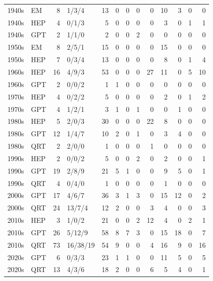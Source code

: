 \begin{longtable}{@{}llrlrrrrrrrrr@{}}
1940s & EM & 8 & 1/3/4 & 13 & 0 & 0 & 0 & 0 & 10 & 3 & 0 & 0 \\
1940s & HEP & 4 & 0/1/3 & 5 & 0 & 0 & 0 & 0 & 3 & 0 & 1 & 1 \\
1940s & GPT & 2 & 1/1/0 & 2 & 0 & 0 & 2 & 0 & 0 & 0 & 0 & 0 \\
1950s & EM & 8 & 2/5/1 & 15 & 0 & 0 & 0 & 0 & 15 & 0 & 0 & 0 \\
1950s & HEP & 7 & 0/3/4 & 13 & 0 & 0 & 0 & 0 & 8 & 0 & 1 & 4 \\
1960s & HEP & 16 & 4/9/3 & 53 & 0 & 0 & 0 & 27 & 11 & 0 & 5 & 10 \\
1960s & GPT & 2 & 0/0/2 & 1 & 1 & 0 & 0 & 0 & 0 & 0 & 0 & 0 \\
1970s & HEP & 4 & 0/2/2 & 5 & 0 & 0 & 0 & 0 & 2 & 0 & 1 & 2 \\
1970s & GPT & 4 & 1/2/1 & 3 & 1 & 0 & 1 & 0 & 0 & 1 & 0 & 0 \\
1980s & HEP & 5 & 2/0/3 & 30 & 0 & 0 & 0 & 22 & 8 & 0 & 0 & 0 \\
1980s & GPT & 12 & 1/4/7 & 10 & 2 & 0 & 1 & 0 & 3 & 4 & 0 & 0 \\
1980s & QRT & 2 & 2/0/0 & 1 & 0 & 0 & 0 & 1 & 0 & 0 & 0 & 0 \\
1990s & HEP & 2 & 0/0/2 & 5 & 0 & 0 & 2 & 0 & 2 & 0 & 0 & 1 \\
1990s & GPT & 19 & 2/8/9 & 21 & 5 & 1 & 0 & 0 & 9 & 5 & 0 & 1 \\
1990s & QRT & 4 & 0/4/0 & 1 & 0 & 0 & 0 & 0 & 1 & 0 & 0 & 0 \\
2000s & GPT & 17 & 4/6/7 & 36 & 3 & 1 & 3 & 0 & 15 & 12 & 0 & 2 \\
2000s & QRT & 24 & 13/7/4 & 12 & 2 & 0 & 0 & 3 & 4 & 0 & 0 & 3 \\
2010s & HEP & 3 & 1/0/2 & 21 & 0 & 0 & 2 & 12 & 4 & 0 & 2 & 1 \\
2010s & GPT & 26 & 5/12/9 & 58 & 8 & 7 & 3 & 0 & 15 & 18 & 0 & 7 \\
2010s & QRT & 73 & 16/38/19 & 54 & 9 & 0 & 0 & 4 & 16 & 9 & 0 & 16 \\
2020s & GPT & 6 & 0/3/3 & 23 & 1 & 1 & 0 & 0 & 11 & 5 & 0 & 5 \\
2020s & QRT & 13 & 4/3/6 & 18 & 2 & 0 & 0 & 6 & 5 & 4 & 0 & 1 \\
\bottomrule\end{longtable}
